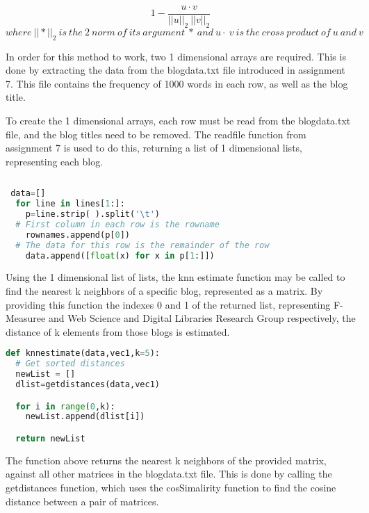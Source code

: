 \documentclass[11pt]{scrartcl} %
\begin{document}
$$ 1 - \frac{u \cdot v}{||u|| _2  \ ||v|| _2}   $$
$ where \ || * ||_2 \ is \ the \ 2 \ norm \ of \ its \ argument \ * \ and \ u   \cdot \ v \ is \ the \ cross \ product \ of \ u \ and \ v $

\bigskip
\tabto{2.0cm} In order for this method to work, two 1 dimensional arrays are required. This is done by extracting the data from the blogdata.txt file introduced in assignment 7. This file contains the frequency of 1000 words in each row, as well as the blog title. \newline \newline 

\tabto{2.0cm} To create the 1 dimensional arrays, each row must be read from the blogdata.txt file, and the blog titles need to be removed. The readfile function from assignment 7 is used to do this, returning a list of 1 dimensional lists, representing each blog. 

\begin{lstlisting}[language = Python, caption=Extract numbers from blogdata.txt file]
 
 data=[]
  for line in lines[1:]:
    p=line.strip( ).split('\t')
  # First column in each row is the rowname
    rownames.append(p[0])
  # The data for this row is the remainder of the row
    data.append([float(x) for x in p[1:]])


\end{lstlisting} \bigskip 

\tabto{2.0cm} Using the 1 dimensional list of lists, the knn estimate function may be called to find the nearest k neighbors of a specific blog, represented as a matrix. By providing this function the indexes 0 and 1 of the returned list, representing F-Measuree and Web Science and Digital Libraries Research Group respectively, the distance of k elements from those blogs is estimated. 

\begin{lstlisting}[language = Python, caption= knn measure function]
def knnestimate(data,vec1,k=5):
  # Get sorted distances
  newList = []
  dlist=getdistances(data,vec1)

  for i in range(0,k):
    newList.append(dlist[i])

  return newList
\end{lstlisting}

\tabto{2.0cm} The function above returns the nearest k neighbors of the provided matrix, against all other matrices in the blogdata.txt file. This is done by calling the getdistances function, which uses the cosSimalirity function to find the cosine distance between a pair of matrices.
\end{document}
